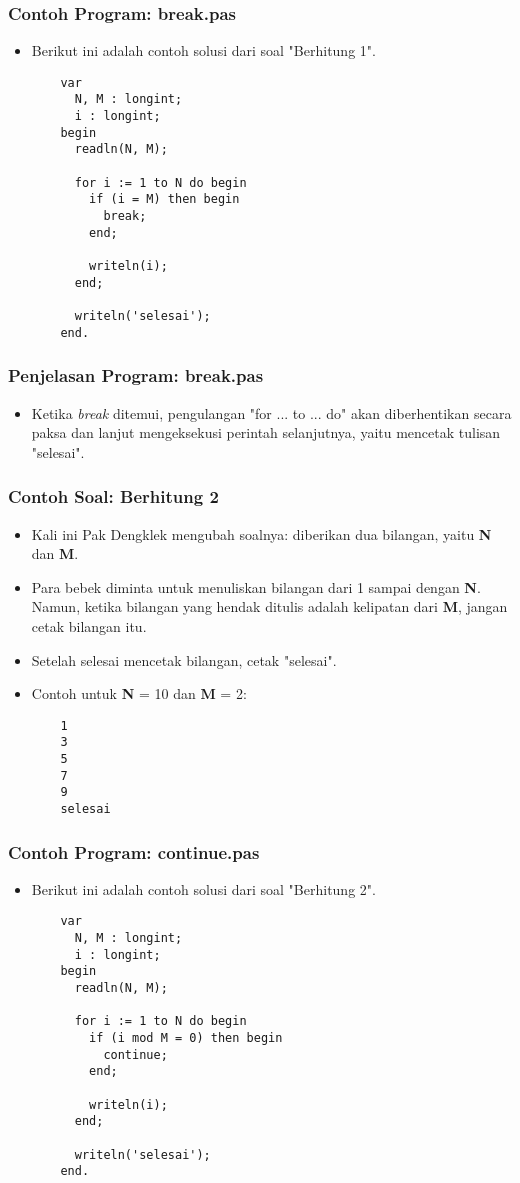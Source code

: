 \documentclass{beamer}
\begin{document}
\begin{frame}[fragile]
\frametitle{Contoh Program: break.pas}
\begin{itemize}
  \item Berikut ini adalah contoh solusi dari soal "Berhitung 1".
  \begin{lstlisting}
    var
      N, M : longint;
      i : longint;
    begin
      readln(N, M);

      for i := 1 to N do begin
        if (i = M) then begin
          break;
        end;

        writeln(i);
      end;

      writeln('selesai');
    end.
  \end{lstlisting}
\end{itemize}
\end{frame}

\begin{frame}
\frametitle{Penjelasan Program: break.pas}
\begin{itemize}
  \item Ketika \textit{break} ditemui, pengulangan "for ... to ... do" akan diberhentikan secara paksa dan lanjut mengeksekusi perintah selanjutnya, yaitu mencetak tulisan "selesai".
\end{itemize}
\end{frame}

\begin{frame}[fragile]
\frametitle{Contoh Soal: Berhitung 2}
\begin{itemize}
  \item Kali ini Pak Dengklek mengubah soalnya: diberikan dua bilangan, yaitu \textbf{N} dan \textbf{M}.
  \item Para bebek diminta untuk menuliskan bilangan dari 1 sampai dengan \textbf{N}. Namun, ketika bilangan yang hendak ditulis adalah \alert{kelipatan} dari \textbf{M}, jangan cetak bilangan itu.
  \item Setelah selesai mencetak bilangan, cetak "selesai".
  \item Contoh untuk \textbf{N} = 10 dan \textbf{M} = 2:
  \begin{lstlisting}
    1
    3
    5
    7
    9
    selesai
  \end{lstlisting}
\end{itemize}
\end{frame}

\begin{frame}[fragile]
\frametitle{Contoh Program: continue.pas}
\begin{itemize}
  \item Berikut ini adalah contoh solusi dari soal "Berhitung 2".
  \begin{lstlisting}
    var
      N, M : longint;
      i : longint;
    begin
      readln(N, M);

      for i := 1 to N do begin
        if (i mod M = 0) then begin
          continue;
        end;

        writeln(i);
      end;

      writeln('selesai');
    end.
  \end{lstlisting}
\end{itemize}
\end{frame}
\end{document}
